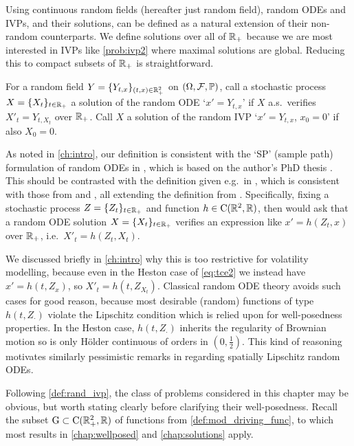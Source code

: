 Using continuous random fields (hereafter just random field), random ODEs and IVPs, and their solutions, can be defined as a natural extension of their non-random counterparts. We define solutions over all of $\mathbb{R}_+$ because we are most interested in IVPs like \autoref{prob:ivp2} where maximal solutions are global. Reducing this to compact subsets of $\mathbb{R}_+$ is straightforward.

\begin{definition}\label{def:rand_ivp}
    For a random field $Y=\{Y_{t,x}\}_{(t,x)\in\mathbb{R}_+^2}$ on $(\Omega,\mathcal{F},\mathbb{P})$, call a stochastic process $X=\{X_t\}_{t\in\mathbb{R}_+}$ a solution of the random ODE `$x'=Y_{t,x}$' if $X$ a.s.~verifies $X'_t = Y_{t,X_t}$ over $\mathbb{R}_+$. Call $X$ a solution of the random IVP `$x'=Y_{t,x}$, $x_0=0$' if also $X_0=0$.
\end{definition}

As noted in \autoref{ch:intro}, our definition is consistent with the `SP' (sample path) formulation of random ODEs in \cite{strand_1970}, which is based on the author's PhD thesis \cite{strand_1968}. This should be contrasted with the definition given e.g.~in \cite{han_2017}, which is consistent with those from \cite{soong_1973} and \cite{sussmann_1978}, all extending the definition from \cite{srinivasan_1971}. Specifically, fixing a stochastic process $Z=\{Z_t\}_{t\in\mathbb{R}_+}$ and function $h\in\mathrm{C}(\mathbb{R}^2,\mathbb{R})$, then \cite{han_2017} would ask that a random ODE solution $X=\{X_t\}_{t\in\mathbb{R}_+}$ verifies an expression like $x'=h(Z_t,x)$ over $\mathbb{R}_+$, i.e.~$X'_t=h(Z_t,X_t)$.

We discussed briefly in \autoref{ch:intro} why this is too restrictive for volatility modelling, because even in the Heston case of \autoref{eq:tce2} we instead have $x'=h(t,Z_x)$, so $X'_t=h(t,Z_{X_t})$. Classical random ODE theory avoids such cases for good reason, because most desirable (random) functions of type $h(t,Z_\cdot)$ violate the Lipschitz condition which is relied upon for well-posedness properties. In the Heston case, $h(t,Z_\cdot)$ inherits the regularity of Brownian motion so is only H\"older continuous of orders in $(0,\frac12)$. This kind of reasoning motivates similarly pessimistic remarks in \cite{soong_1973} regarding spatially Lipschitz random ODEs.

Following \autoref{def:rand_ivp}, the class of problems considered in this chapter may be obvious, but worth stating clearly before clarifying their well-posedness. Recall the subset $\mathrm{G}\subset\mathrm{C}(\mathbb{R}_+^2,\mathbb{R})$ of functions from \autoref{def:mod_driving_func}, to which most results in \autoref{chap:wellposed} and \autoref{chap:solutions} apply.


